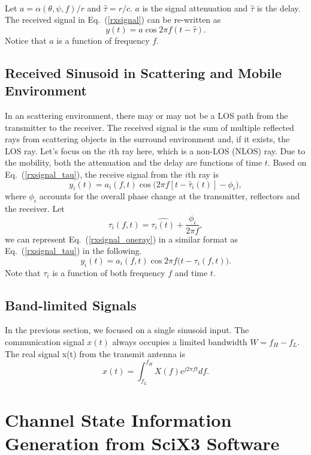 \documentclass[letterpaper,11pt]{article}
\begin{document}
~\\

Let $a=\alpha(\theta, \psi, f)/r$ and $\hat{\tau}=r/c$. $a$ is the signal attenuation and $\hat{\tau}$ is the delay. The received signal in Eq.~(\ref{rxsignal}) can be re-written as
\begin{equation}\label{rxsignal_tau}
y(t)=a\cos2\pi f(t-\hat{\tau}).
\end{equation}
Notice that $a$ is a function of frequency $f$.

\subsection{Received Sinusoid in Scattering and Mobile Environment}

In an scattering environment, there may or may not be a LOS path from the transmitter to the receiver. The received signal is the sum of multiple reflected rays from scattering objects in the surround environment and, if it exists, the LOS ray. Let's focus on the $i$th ray here, which is a non-LOS (NLOS) ray. Due to the mobility, both the attenuation and the delay are functions of time $t$. Based on Eq.~(\ref{rxsignal_tau}), the receive signal from the $i$th ray is
\begin{equation}\label{rxsignal_oneray}
\displaystyle y_i(t)=a_i(f,t)\cos\big(2\pi f[t-\hat{\tau}_i(t)]-\phi_i\big),
\end{equation}
where $\phi_i$ accounts for the overall phase change at the transmitter, reflectors and the receiver. Let
$$
\tau_i(f, t)=\hat{\tau_i(t)}+\frac{\phi_i}{2\pi f},
$$ 
we can represent Eq.~(\ref{rxsignal_oneray}) in a similar format as Eq.~(\ref{rxsignal_tau}) in the following.
\begin{equation}
y_i(t)=a_i(f,t)\cos2\pi f\big(t-\tau_i(f, t)\big).
\end{equation}
Note that $\tau_i$ is a function of both frequency $f$ and time $t$.

\subsection{Band-limited Signals}

In the previous section, we focused on a single sinusoid input. The communication signal $x(t)$ always occupies a limited bandwidth $W=f_H-f_L$. The real signal x(t) from the transmit antenna is 
\begin{equation}
\displaystyle x(t)=\int_{f_L}^{f_H}X(f)e^{j2\pi ft}df.
\end{equation}


\section{Channel State Information Generation from SciX3 Software}



\end{document}
